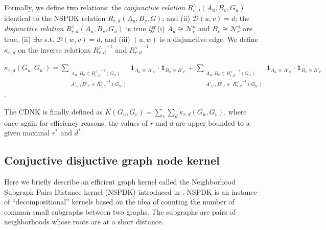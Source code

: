 Formally, we define two relations: the \textit{conjunctive relation} $R^{\wedge}_{r,d}(A_u, B_v, G_u)$ identical to the NSPDK relation $R_{r,d}(A_u, B_v, G)$,  and (ii) $\mathcal{D}(u,v)= d$; the \textit{disjunctive relation} $R_{r,d}^{\vee}(A_u, B_v, G_u)$ is true {\em iff} (i)  $A_u \cong \mathcal{N}_r^u$ and $B_v \cong \mathcal{N}_r^u$ are true, (ii) $\exists w$ s.t. $\mathcal{D}(w,v)= d$, and (iii) $(u,w)$ is a disjunctive edge. We define $\kappa_{r,d}$ on the  inverse relations ${R^{\wedge}_{r,d}}^{ -1}$ and ${R^{\vee}_{r,d}}^{ -1}$
\begin{center}
 $\kappa_{r,d}(G_u,G_{u'}) = \!\!\!\!\!\!\!\!\!\!\!\!
 \sum\limits_{\substack {A_u,{B}_{v} \in {R_{r,d}^{\wedge}}^{ -1}(G_u) \\ A'_{u'},{B'}_{v'} \in {R_{r,d}^{\wedge}}^{ -1}(G_{u'}) }} \!\!\!\!\!\!\!\!\!\!\!\!
  { \textbf{1}_{A_u \cong A'_{u'}} \cdot { \textbf{1}_{B_{v} \cong B'_{v'}}}}
+ \!\!\!\!\!\!\!\!\!\!\!\!
 \sum\limits_{\substack {A_u,{B}_{v} \in {R_{r,d}^{\vee}}^{ -1}(G_u) \\
  A'_{u'},{B'}_{v'} \in \ {R_{r,d}^{\vee}}^{ -1}(G_{u'}) }} \!\!\!\!\!\!\!\!\!\!\!\!
  { \textbf{1}_{A_u \cong A'_{u'}} \cdot { \textbf{1}_{B_{v} \cong B'_{v'}}}}
  $.
\end{center}
The CDNK is finally defined as $K(G_u,G_v) = \sum\limits_{r}{\sum\limits_{d}{\kappa_{r,d}(G_u,G_v)}}$, where once again for efficiency reasons, the values of $r$ and $d$ are upper bounded to a given maximal $r^*$ and $d^*$.

\subsection{Conjuctive disjuctive graph node kernel}
Here we briefly describe an efficient graph kernel called the Neighborhood Subgraph Pairs Distance kernel (NSPDK) introduced in \cite{nspdk}. NSPDK is an instance of ``decompositional'' kernels \cite{convolution-kernel} based on the idea of counting the number of common small subgraphs between two graphs. The subgraphs are pairs of neighborhoods whose roots are at a short distance. 

